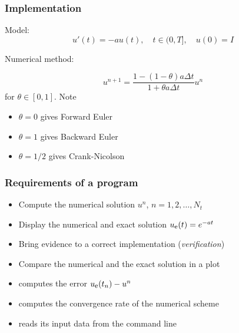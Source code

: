 \documentclass{beamer}
\begin{document}
\begin{frame}
\frametitle{Implementation}

\label{decay:impl1}

Model:
\[
u'(t) = -au(t),\quad t\in (0,T], \quad u(0)=I
\]

Numerical method:

\[
u^{n+1} = \frac{1 - (1-\theta) a\Delta t}{1 + \theta a\Delta t}u^n
\]
for $\theta\in [0,1]$. Note

\begin{itemize}
 \item $\theta=0$ gives Forward Euler

 \item $\theta=1$ gives Backward Euler

 \item $\theta=1/2$ gives Crank-Nicolson
\end{itemize}

\noindent

\end{frame}

\begin{frame}
\frametitle{Requirements of a program}

\begin{itemize}
  \item Compute the numerical solution $u^n$, $n=1,2,\ldots,N_t$

  \item Display the numerical and exact solution $\uex(t)=e^{-at}$

  \item Bring evidence to a correct implementation (\emph{verification})

  \item Compare the numerical and the exact solution in a plot

  \item computes the error $\uex (t_n) - u^n$

  \item computes the convergence rate of the numerical scheme

  \item reads its input data from the command line
\end{itemize}

\noindent
\end{frame}
\end{document}

